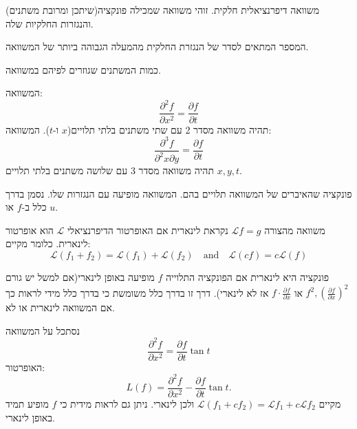 \documentclass{tstextbook}
\begin{document}
\begin{definition}[מד"ח]
משוואה דיפרנציאלית חלקית. זוהי משוואה שמכילה פונקציה(שיתכן ומרובת משתנים) והנגזרות החלקיות שלה.

\end{definition}
\begin{definition}[סדר של מד"ח]
המספר המתאים לסדר של הנגזרת החלקית מהמעלה הגבוהה ביותר של המשוואה.

\end{definition}
\begin{definition}
כמות המשתנים שגוזרים לפיהם במשוואה.

\end{definition}
\begin{example}
המשוואה:
$$\frac{\partial^{2}f}{\partial x^{2}} =\frac{\partial f}{\partial t} $$
תהיה משוואה מסדר 2 עם שתי משתנים בלתי תלויים(\(x\) ו-\(t\)).
המשוואה:
$$\frac{\partial^{3}f}{\partial^{2}x\partial y} =\frac{\partial f}{\partial t} $$
תהיה משוואה מסדר 3 עם שלושה משתנים בלתי תלויים \(x,y,t\).

\end{example}
\begin{definition}
פונקציה שהאיברים של המשוואה תלויים בהם. המשוואה מופיעה עם הנגזרות שלו. נסמן בדרך כלל ב-\(f\) או \(u\).

\end{definition}
\begin{definition}[מד"ח לינארי]
משוואה מהצורה \(\mathcal{L}f=g\) נקראת לינארית אם האופרטור הדיפרנציאלי \(\mathcal{L}\) הוא אופרטור לינארית. כלומר מקיים:
$$\mathcal{L}(f_{1}+f_{2})=\mathcal{L}(f_{1})+\mathcal{L}(f_{2})\quad\mathrm{and}\quad \mathcal{L}(c f)=c \mathcal{L}(f)$$

\end{definition}
\begin{corollary}
פונקציה היא לינארית אם הפונקציה התלוייה \(f\) מופיעה באופן לינארי(אם למשל יש גורם \(f^{2},\left( \frac{\partial f}{\partial x} \right)^{2}\) או \(f\cdot \frac{\partial f}{\partial x}\) אז לא לינארי). דרך זו בדרך כלל משומשת כי בדרך כלל מידי לראות כך אם המשוואה לינארית או לא.

\end{corollary}
\begin{example}
נסתכל על המשוואה
$$\frac{\partial^{2} f}{\partial x^{2}}=\frac{\partial f}{\partial t} \tan t $$
האופרטור:
$$L(f)={\frac{\partial^{2}f}{\partial x^{2}}}-{\frac{\partial f}{\partial t}}\tan t.$$
מקיים \(\mathcal{L}(f_{1}+cf_{2})=\mathcal{L}f_{1}+c\mathcal{L}f_{2}\) ולכן לינארי. ניתן גם לראות מידית כי \(f\) מופיע תמיד באופן לינארי.

\end{example}
\end{document}
